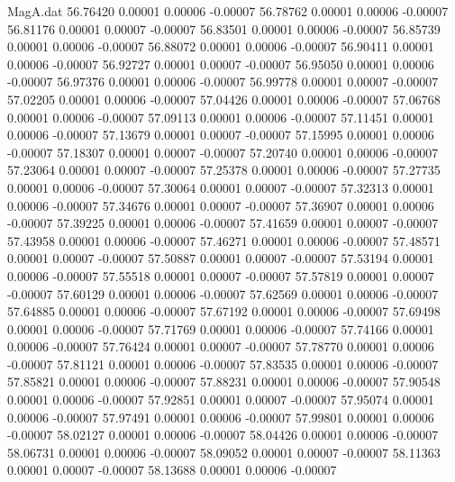 \begin{filecontents}{MagA.dat}
  56.76420    0.00001    0.00006   -0.00007
  56.78762    0.00001    0.00006   -0.00007
  56.81176    0.00001    0.00007   -0.00007
  56.83501    0.00001    0.00006   -0.00007
  56.85739    0.00001    0.00006   -0.00007
  56.88072    0.00001    0.00006   -0.00007
  56.90411    0.00001    0.00006   -0.00007
  56.92727    0.00001    0.00007   -0.00007
  56.95050    0.00001    0.00006   -0.00007
  56.97376    0.00001    0.00006   -0.00007
  56.99778    0.00001    0.00007   -0.00007
  57.02205    0.00001    0.00006   -0.00007
  57.04426    0.00001    0.00006   -0.00007
  57.06768    0.00001    0.00006   -0.00007
  57.09113    0.00001    0.00006   -0.00007
  57.11451    0.00001    0.00006   -0.00007
  57.13679    0.00001    0.00007   -0.00007
  57.15995    0.00001    0.00006   -0.00007
  57.18307    0.00001    0.00007   -0.00007
  57.20740    0.00001    0.00006   -0.00007
  57.23064    0.00001    0.00007   -0.00007
  57.25378    0.00001    0.00006   -0.00007
  57.27735    0.00001    0.00006   -0.00007
  57.30064    0.00001    0.00007   -0.00007
  57.32313    0.00001    0.00006   -0.00007
  57.34676    0.00001    0.00007   -0.00007
  57.36907    0.00001    0.00006   -0.00007
  57.39225    0.00001    0.00006   -0.00007
  57.41659    0.00001    0.00007   -0.00007
  57.43958    0.00001    0.00006   -0.00007
  57.46271    0.00001    0.00006   -0.00007
  57.48571    0.00001    0.00007   -0.00007
  57.50887    0.00001    0.00007   -0.00007
  57.53194    0.00001    0.00006   -0.00007
  57.55518    0.00001    0.00007   -0.00007
  57.57819    0.00001    0.00007   -0.00007
  57.60129    0.00001    0.00006   -0.00007
  57.62569    0.00001    0.00006   -0.00007
  57.64885    0.00001    0.00006   -0.00007
  57.67192    0.00001    0.00006   -0.00007
  57.69498    0.00001    0.00006   -0.00007
  57.71769    0.00001    0.00006   -0.00007
  57.74166    0.00001    0.00006   -0.00007
  57.76424    0.00001    0.00007   -0.00007
  57.78770    0.00001    0.00006   -0.00007
  57.81121    0.00001    0.00006   -0.00007
  57.83535    0.00001    0.00006   -0.00007
  57.85821    0.00001    0.00006   -0.00007
  57.88231    0.00001    0.00006   -0.00007
  57.90548    0.00001    0.00006   -0.00007
  57.92851    0.00001    0.00007   -0.00007
  57.95074    0.00001    0.00006   -0.00007
  57.97491    0.00001    0.00006   -0.00007
  57.99801    0.00001    0.00006   -0.00007
  58.02127    0.00001    0.00006   -0.00007
  58.04426    0.00001    0.00006   -0.00007
  58.06731    0.00001    0.00006   -0.00007
  58.09052    0.00001    0.00007   -0.00007
  58.11363    0.00001    0.00007   -0.00007
  58.13688    0.00001    0.00006   -0.00007

\end{filecontents}
